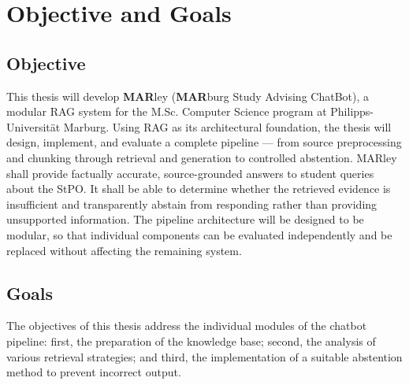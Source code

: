 \documentclass[10pt,twocolumn]{article}
\begin{document}
\section{Objective and Goals}

\subsection{Objective}
This thesis will develop \textbf{MAR}ley (\textbf{MAR}burg Study Advising ChatBot), a modular RAG system for the M.Sc. Computer Science program at Philipps-Universit\"at Marburg. Using RAG as its architectural foundation, the thesis will design, implement, and evaluate a complete pipeline --- from source preprocessing and chunking through retrieval and generation to controlled abstention. MARley shall provide factually accurate, source-grounded answers to student queries about the StPO. It shall be able to determine whether the retrieved evidence is insufficient and transparently abstain from responding rather than providing unsupported information. The pipeline architecture will be designed to be modular, so that individual components can be evaluated independently and be replaced without affecting the remaining system.

\subsection{Goals}
The objectives of this thesis address the individual modules of the chatbot pipeline: first, the preparation of the knowledge base; second, the analysis of various retrieval strategies; and third, the implementation of a suitable abstention method to prevent incorrect output.
\end{document}
